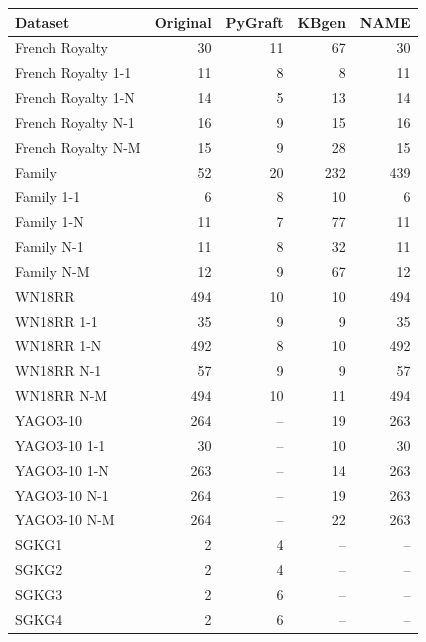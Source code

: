 \begin{tabular}{lrrrr}
\toprule
Dataset & Original & PyGraft & KBgen & NAME \\
\midrule
French Royalty & 30 & 11 & 67 & 30 \\
French Royalty 1-1 & 11 & 8 & 8 & 11 \\
French Royalty 1-N & 14 & 5 & 13 & 14 \\
French Royalty N-1 & 16 & 9 & 15 & 16 \\
French Royalty N-M & 15 & 9 & 28 & 15 \\
\midrule
Family & 52 & 20 & 232 & 439 \\
Family 1-1 & 6 & 8 & 10 & 6 \\
Family 1-N & 11 & 7 & 77 & 11 \\
Family N-1 & 11 & 8 & 32 & 11 \\
Family N-M & 12 & 9 & 67 & 12 \\
\midrule
WN18RR & 494 & 10 & 10 & 494 \\
WN18RR 1-1 & 35 & 9 & 9 & 35 \\
WN18RR 1-N & 492 & 8 & 10 & 492 \\
WN18RR N-1 & 57 & 9 & 9 & 57 \\
WN18RR N-M & 494 & 10 & 11 & 494 \\
\midrule
YAGO3-10 & 264 & – & 19 & 263 \\
YAGO3-10 1-1 & 30 & – & 10 & 30 \\
YAGO3-10 1-N & 263 & – & 14 & 263 \\
YAGO3-10 N-1 & 264 & – & 19 & 263 \\
YAGO3-10 N-M & 264 & – & 22 & 263 \\
\midrule
SGKG1 & 2 & 4 & – & – \\
SGKG2 & 2 & 4 & – & – \\
SGKG3 & 2 & 6 & – & – \\
SGKG4 & 2 & 6 & – & – \\
\bottomrule
\end{tabular}
